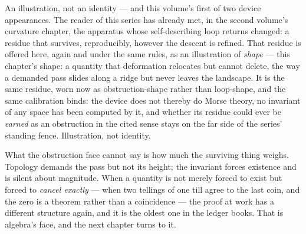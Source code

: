 \begin{fence}
An illustration, not an identity --- and this volume's first of two
device appearances. The reader of this series has already met, in the
second volume's curvature chapter, the apparatus whose self-describing
loop returns changed: a residue that survives, reproducibly, however the
descent is refined. That residue is offered here, again and under the
same rules, as an illustration of \emph{shape} --- this chapter's shape:
a quantity that deformation relocates but cannot delete, the way a
demanded pass slides along a ridge but never leaves the landscape. It is
the same residue, worn now as obstruction-shape rather than loop-shape,
and the same calibration binds: the device does not thereby do Morse
theory, no invariant of any space has been computed by it, and whether
its residue could ever be \emph{earned} as an obstruction in the cited
sense stays on the far side of the series' standing fence. Illustration,
not identity.
\end{fence}

What the obstruction face cannot say is how much the surviving thing
weighs. Topology demands the pass but not its height; the invariant
forces existence and is silent about magnitude. When a quantity is not
merely forced to exist but forced to \emph{cancel exactly} --- when two
tellings of one till agree to the last coin, and the zero is a theorem
rather than a coincidence --- the proof at work has a different
structure again, and it is the oldest one in the ledger books. That is
algebra's face, and the next chapter turns to it.
